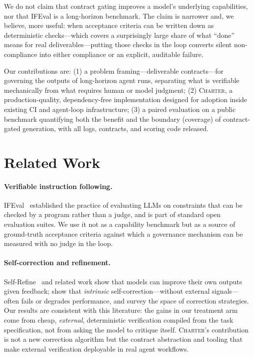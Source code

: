 \documentclass{article}
\begin{document}
We do not claim that contract gating improves a model's underlying capabilities,
nor that IFEval is a long-horizon benchmark. The claim is narrower and, we
believe, more useful: when acceptance criteria can be written down as
deterministic checks---which covers a surprisingly large share of what ``done''
means for real deliverables---putting those checks in the loop converts silent
non-compliance into either compliance or an explicit, auditable failure.

Our contributions are: (1) a problem framing---deliverable contracts---for
governing the outputs of long-horizon agent runs, separating what is verifiable
mechanically from what requires human or model judgment; (2) \textsc{Charter}, a
production-quality, dependency-free implementation designed for adoption inside
existing CI and agent-loop infrastructure; (3) a paired evaluation on a public
benchmark quantifying both the benefit and the boundary (coverage) of
contract-gated generation, with all logs, contracts, and scoring code released.

\section{Related Work}

\paragraph{Verifiable instruction following.} IFEval~\citep{zhou2023ifeval}
established the practice of evaluating LLMs on constraints that can be checked by
a program rather than a judge, and is part of standard open evaluation suites. We
use it not as a capability benchmark but as a source of ground-truth acceptance
criteria against which a governance mechanism can be measured with no judge in
the loop.

\paragraph{Self-correction and refinement.} Self-Refine~\citep{madaan2023selfrefine}
and related work show that models can improve their own outputs given feedback;
\citet{huang2024cannot} show that \emph{intrinsic} self-correction---without
external signals---often fails or degrades performance, and \citet{pan2023survey}
survey the space of correction strategies. Our results are consistent with this
literature: the gains in our treatment arm come from cheap, \emph{external},
deterministic verification compiled from the task specification, not from asking
the model to critique itself. \textsc{Charter}'s contribution is not a new
correction algorithm but the contract abstraction and tooling that make external
verification deployable in real agent workflows.
\end{document}

